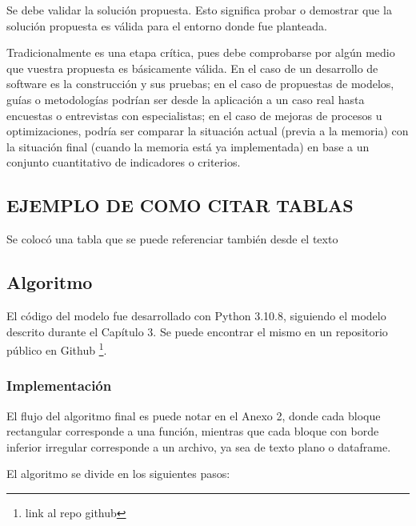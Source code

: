 
Se debe validar la solución propuesta. Esto significa probar o demostrar que la solución propuesta es válida para el entorno donde fue planteada.

Tradicionalmente es una etapa crítica, pues debe comprobarse por algún medio que vuestra propuesta es básicamente válida. En el caso de un desarrollo de software es la construcción y sus pruebas; en el caso de propuestas de modelos, guías o metodologías podrían ser desde la aplicación a un caso real hasta encuestas o entrevistas con especialistas; en el caso de mejoras de procesos u optimizaciones, podría ser comparar la situación actual (previa a la memoria) con la situación final (cuando la memoria está ya implementada) en base a un conjunto cuantitativo de indicadores o criterios.

\subsection{EJEMPLO DE COMO CITAR TABLAS}

Se colocó una tabla que se puede referenciar también desde el texto 


\subsection{Algoritmo}

El código del modelo fue desarrollado con Python 3.10.8, siguiendo el modelo descrito durante el Capítulo 3. Se puede encontrar el mismo en un repositorio público en Github \footnote{link al repo github}.

\subsubsection{Implementación}

El flujo del algoritmo final es puede notar en el Anexo 2, donde cada bloque rectangular corresponde a una función, mientras que cada bloque con borde inferior irregular corresponde a un archivo, ya sea de texto plano o dataframe.

El algoritmo se divide en los siguientes pasos:

